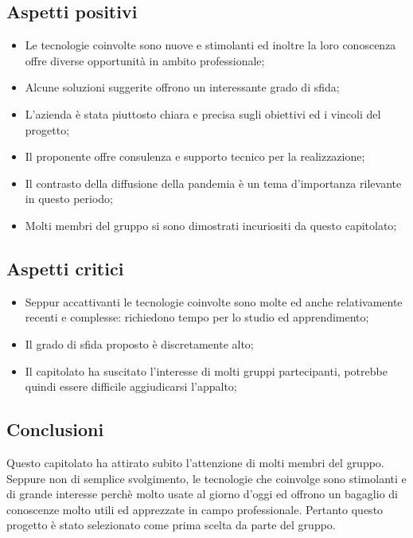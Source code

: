 \subsection{Aspetti positivi}
\begin{itemize}
\item Le tecnologie coinvolte sono nuove e stimolanti ed inoltre la loro conoscenza offre diverse opportunità in ambito professionale;
\item Alcune soluzioni suggerite offrono un interessante grado di sfida;
\item L'azienda è stata piuttosto chiara e precisa sugli obiettivi ed i vincoli del progetto;
\item Il proponente offre consulenza e supporto tecnico per la realizzazione;
\item Il contrasto della diffusione della pandemia è un tema d'importanza rilevante in questo periodo;
\item Molti membri del gruppo si sono dimostrati incuriositi da questo capitolato;

\end{itemize}

\subsection{Aspetti critici}
\begin{itemize}
\item Seppur accattivanti le tecnologie coinvolte sono molte ed anche relativamente recenti e complesse: richiedono tempo per lo studio ed apprendimento;
\item Il grado di sfida proposto è discretamente alto;
\item Il capitolato ha suscitato l'interesse di molti gruppi partecipanti, potrebbe quindi essere difficile aggiudicarsi l'appalto;
\end{itemize}

\subsection{Conclusioni}
Questo capitolato ha attirato subito l'attenzione di molti membri del gruppo. Seppure non di semplice svolgimento, le tecnologie che coinvolge sono stimolanti e di grande interesse perchè molto usate al giorno d'oggi ed offrono un bagaglio di conoscenze molto utili ed apprezzate in campo professionale. Pertanto questo progetto è stato selezionato come prima scelta da parte del gruppo.

